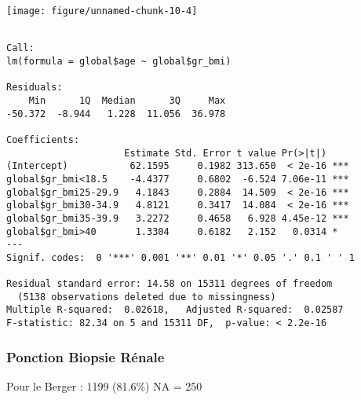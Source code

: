 \documentclass[11pt,a4paper]{article}\usepackage[]{graphicx}\usepackage[]{color}
\makeatletter
\def\maxwidth{ %
  \ifdim\Gin@nat@width>\linewidth
    \linewidth
  \else
    \Gin@nat@width
  \fi
}
\newenvironment{kframe}{%
 \def\at@end@of@kframe{}%
 \ifinner\ifhmode%
  \def\at@end@of@kframe{\end{minipage}}%
  \begin{minipage}{\columnwidth}%
 \fi\fi%
 \def\FrameCommand##1{\hskip\@totalleftmargin \hskip-\fboxsep
 \colorbox{shadecolor}{##1}\hskip-\fboxsep
     \hskip-\linewidth \hskip-\@totalleftmargin \hskip\columnwidth}%
 \MakeFramed {\advance\hsize-\width
   \@totalleftmargin\z@ \linewidth\hsize
   \@setminipage}}%
 {\par\unskip\endMakeFramed%
 \at@end@of@kframe}
\newenvironment{knitrout}{}{} %
\makeatother
\begin{document}
\begin{knitrout}
\texttt{[image: figure/unnamed-chunk-10-4]} 
\begin{kframe}\begin{verbatim}

Call:
lm(formula = global$age ~ global$gr_bmi)

Residuals:
    Min      1Q  Median      3Q     Max 
-50.372  -8.944   1.228  11.056  36.978 

Coefficients:
                     Estimate Std. Error t value Pr(>|t|)    
(Intercept)           62.1595     0.1982 313.650  < 2e-16 ***
global$gr_bmi<18.5    -4.4377     0.6802  -6.524 7.06e-11 ***
global$gr_bmi25-29.9   4.1843     0.2884  14.509  < 2e-16 ***
global$gr_bmi30-34.9   4.8121     0.3417  14.084  < 2e-16 ***
global$gr_bmi35-39.9   3.2272     0.4658   6.928 4.45e-12 ***
global$gr_bmi>40       1.3304     0.6182   2.152   0.0314 *  
---
Signif. codes:  0 '***' 0.001 '**' 0.01 '*' 0.05 '.' 0.1 ' ' 1

Residual standard error: 14.58 on 15311 degrees of freedom
  (5138 observations deleted due to missingness)
Multiple R-squared:  0.02618,	Adjusted R-squared:  0.02587 
F-statistic: 82.34 on 5 and 15311 DF,  p-value: < 2.2e-16
\end{verbatim}
\end{kframe}
\end{knitrout}


      \subsubsection{Ponction Biopsie Rénale}

Pour le Berger : 1199 (81.6\%) NA = 250
\end{document}
